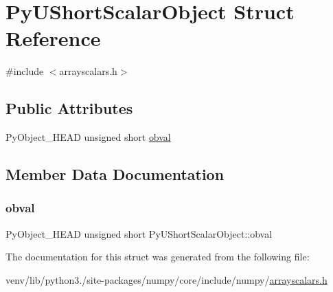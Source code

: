\hypertarget{structPyUShortScalarObject}{}\section{Py\+U\+Short\+Scalar\+Object Struct Reference}
\label{structPyUShortScalarObject}


{\ttfamily \#include $<$arrayscalars.\+h$>$}

\subsection*{Public Attributes}
\begin{DoxyCompactItemize}
\item 
Py\+Object\+\_\+\+H\+E\+AD unsigned short \hyperlink{structPyUShortScalarObject_aa415447f5b75742410c88f9257172377}{obval}
\end{DoxyCompactItemize}


\subsection{Member Data Documentation}
\mbox{\label{structPyUShortScalarObject_aa415447f5b75742410c88f9257172377}} 
\subsubsection{\texorpdfstring{obval}{obval}}
{\footnotesize\ttfamily Py\+Object\+\_\+\+H\+E\+AD unsigned short Py\+U\+Short\+Scalar\+Object\+::obval}



The documentation for this struct was generated from the following file\+:\begin{DoxyCompactItemize}
\item 
venv/lib/python3./site-\/packages/numpy/core/include/numpy/\hyperlink{arrayscalars_8h}{arrayscalars.\+h}\end{DoxyCompactItemize}
